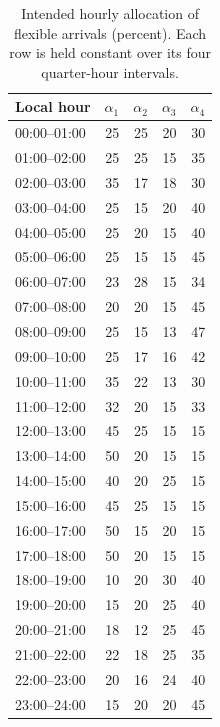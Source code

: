 \begin{table}[htbp]
\centering\small
\caption{Intended hourly allocation of flexible arrivals (percent). Each row is held constant over its four quarter-hour intervals.}\label{tab:hourly-tranches}
\begin{tabular}{@{}lrrrr@{}}\toprule
Local hour & $\alpha_1$ & $\alpha_2$ & $\alpha_3$ & $\alpha_4$ \\\midrule
00:00--01:00 & 25 & 25 & 20 & 30 \\
01:00--02:00 & 25 & 25 & 15 & 35 \\
02:00--03:00 & 35 & 17 & 18 & 30 \\
03:00--04:00 & 25 & 15 & 20 & 40 \\
04:00--05:00 & 25 & 20 & 15 & 40 \\
05:00--06:00 & 25 & 15 & 15 & 45 \\
06:00--07:00 & 23 & 28 & 15 & 34 \\
07:00--08:00 & 20 & 20 & 15 & 45 \\
08:00--09:00 & 25 & 15 & 13 & 47 \\
09:00--10:00 & 25 & 17 & 16 & 42 \\
10:00--11:00 & 35 & 22 & 13 & 30 \\
11:00--12:00 & 32 & 20 & 15 & 33 \\
12:00--13:00 & 45 & 25 & 15 & 15 \\
13:00--14:00 & 50 & 20 & 15 & 15 \\
14:00--15:00 & 40 & 20 & 25 & 15 \\
15:00--16:00 & 45 & 25 & 15 & 15 \\
16:00--17:00 & 50 & 15 & 20 & 15 \\
17:00--18:00 & 50 & 20 & 15 & 15 \\
18:00--19:00 & 10 & 20 & 30 & 40 \\
19:00--20:00 & 15 & 20 & 25 & 40 \\
20:00--21:00 & 18 & 12 & 25 & 45 \\
21:00--22:00 & 22 & 18 & 25 & 35 \\
22:00--23:00 & 20 & 16 & 24 & 40 \\
23:00--24:00 & 15 & 20 & 20 & 45 \\
\bottomrule\end{tabular}
\end{table}
